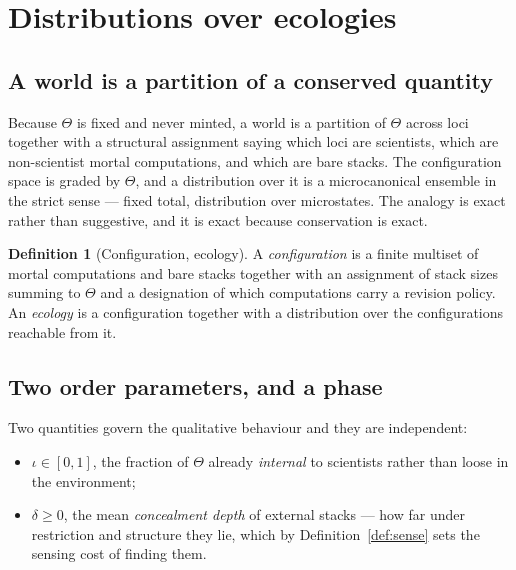 \documentclass[11pt]{article}
\theoremstyle{plain}
\theoremstyle{definition}
\newtheorem{definition}[theorem]{Definition}
\begin{document}
\section{Distributions over ecologies}
\label{sec:distributions}

\subsection{A world is a partition of a conserved quantity}

Because $\Theta$ is fixed and never minted, a world is a partition of $\Theta$ across loci together
with a structural assignment saying which loci are scientists, which are non-scientist mortal
computations, and which are bare stacks. The configuration space is graded by $\Theta$, and a
distribution over it is a microcanonical ensemble in the strict sense --- fixed total, distribution
over microstates. The analogy is exact rather than suggestive, and it is exact because conservation
is exact.

\begin{definition}[Configuration, ecology]
A \emph{configuration} is a finite multiset of mortal computations and bare stacks together with an
assignment of stack sizes summing to $\Theta$ and a designation of which computations carry a revision
policy. An \emph{ecology} is a configuration together with a distribution over the configurations
reachable from it.
\end{definition}

\subsection{Two order parameters, and a phase}

Two quantities govern the qualitative behaviour and they are independent:
\begin{itemize}
\item $\iota \in [0,1]$, the fraction of $\Theta$ already \emph{internal} to scientists rather than
loose in the environment;
\item $\delta \ge 0$, the mean \emph{concealment depth} of external stacks --- how far under
restriction and structure they lie, which by Definition~\ref{def:sense} sets the sensing cost of
finding them.
\end{itemize}
\end{document}

